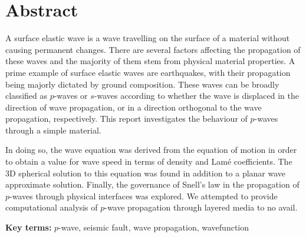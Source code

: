\chapter{Abstract}
\begin{tcolorbox}[title=Abstract,colbacktitle=white!80!black,coltitle=black,arc=0mm,boxrule=0.1mm]
A surface elastic wave is a wave travelling on the surface of a material without causing permanent changes. There are several factors affecting the propagation of these waves and the majority of them stem from physical material properties. A prime example of surface elastic waves are earthquakes, with their propagation being majorly dictated by ground composition. These waves can be broadly classified as $p$-waves or $s$-waves according to whether the wave is displaced in the direction of wave propagation, or in a direction orthogonal to the wave propagation, respectively. This report investigates the behaviour of $p$-waves through a simple material.


In doing so, the wave equation was derived from the equation of motion in order to obtain a value for wave speed in terms of density and Lamé coefficients. The 3D spherical solution to this equation was found in addition to a planar wave approximate solution. Finally, the governance of Snell's law in the propagation of $p$-waves through physical interfaces was explored.
We attempted to provide computational analysis of $p$-wave propagation through layered media to no avail.
\vspace{5mm}

\textbf{Key terms:} $p$-wave, seismic fault, wave propagation, wavefunction
\end{tcolorbox}